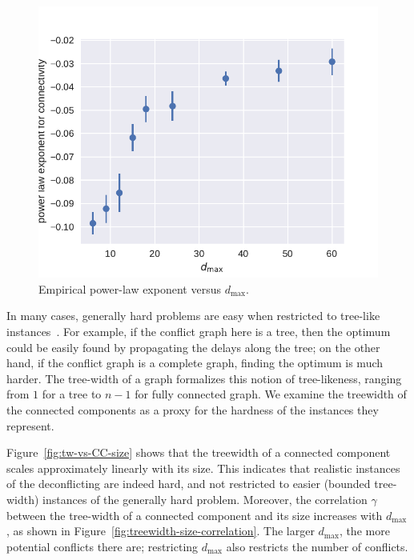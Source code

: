 \begin{figure}[htpb]
\includegraphics[width=0.95\columnwidth]{pics/instances/connectivity_pl.pdf}
\caption[Power-law exponent vs. $d_{\max}$]{Empirical power-law exponent versus $d_{\max}$.}
\label{fig:exponent-vs-dmax}
\end{figure}

In many cases, generally hard problems are easy when restricted to tree-like instances~\cite{bertele1972, halin1976s}.
For example, if the conflict graph here is a tree, then the optimum could be easily found by propagating the delays along the tree;
on the other hand, if the conflict graph is a complete graph, finding the optimum is much harder.
The tree-width of a graph formalizes this notion of tree-likeness, ranging from $1$ for a tree to $n-1$ for fully connected graph.
We examine the treewidth of the connected components as a proxy for the hardness of the instances they represent.

Figure~\ref{fig:tw-vs-CC-size} shows that the treewidth of a connected component scales approximately linearly with its size.
This indicates that realistic instances of the deconflicting are indeed hard, and not restricted to easier (bounded tree-width) instances of the generally hard problem.
Moreover, the correlation $\gamma$ between the tree-width of a connected component and its size increases with $d_{\max}$, as shown in Figure~\ref{fig:treewidth-size-correlation}.
The larger $d_{\max}$, the more potential conflicts there are;
restricting $d_{\max}$ also restricts the number of conflicts.

